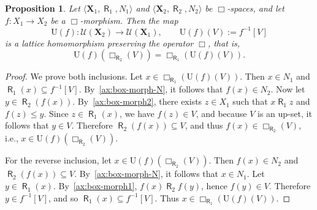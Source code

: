 \documentclass{article}
\newtheorem{proposition}[theorem]{Proposition}
\DeclareMathOperator{\R}{\mathsf{R}}
\newcommand{\X}{\mathbf{X}}
\newcommand{\U}{\mathcal{U}}
\begin{document}
\begin{proposition}
\label{prop:Uf-box-morphism}
Let $\langle \X_1, \R_1, N_1 \rangle$ and $\langle \X_2, \R_2, N_2 \rangle$ be $\Box$-spaces, and let $f \colon X_1 \to X_2$ be a $\Box$-morphism. Then the map
\[
\mathrm{U}(f) \colon \U(\X_2) \to \U(\X_1), \qquad \mathrm{U}(f)(V) := f^{-1}[V]
\]
is a lattice homomorphism preserving the operator $\Box$, that is,
\[
\mathrm{U}(f)(\Box_{\R_2}(V)) = \Box_{\R_1}(\mathrm{U}(f)(V)).
\]
\end{proposition}
\begin{proof}
We prove both inclusions. Let $x \in \Box_{\R_1}(\mathrm{U}(f)(V))$. Then $x \in N_1$ and $\R_1(x) \subseteq f^{-1}[V]$. By~\eqref{ax:box-morph-N}, it follows that $f(x) \in N_2$. Now let $y \in \R_2(f(x))$. By~\eqref{ax:box-morph2}, there exists $z \in X_1$ such that $x\R_1 z$ and $f(z) \leq y$. Since $z \in \R_1(x)$, we have $f(z) \in V$, and because $V$ is an up-set, it follows that $y \in V$. Therefore $\R_2(f(x)) \subseteq V$, and thus $f(x) \in \Box_{\R_2}(V)$, i.e., $x \in \mathrm{U}(f)(\Box_{\R_2}(V))$.

For the reverse inclusion, let $x \in \mathrm{U}(f)(\Box_{\R_2}(V))$. Then $f(x) \in N_2$ and $\R_2(f(x)) \subseteq V$. By~\eqref{ax:box-morph-N}, it follows that $x \in N_1$. Let $y \in \R_1(x)$. By~\eqref{ax:box-morph1}, $f(x) \R_2 f(y)$, hence $f(y) \in V$. Therefore $y \in f^{-1}[V]$, and so $\R_1(x) \subseteq f^{-1}[V]$. Thus $x \in \Box_{\R_1}(\mathrm{U}(f)(V))$.
\end{proof}
\end{document}
